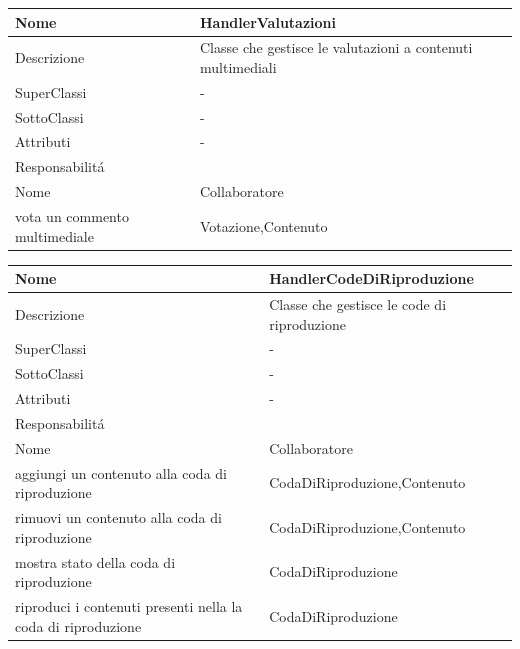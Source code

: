 \begin{center}
    \begin{tabular}{ |p{3cm}|p{3cm}|p{3cm}|p{3cm}| }
        \hline
        Nome & \multicolumn{3}{|p{9cm}|}{HandlerValutazioni} \\\hline
        Descrizione & \multicolumn{3}{|p{9cm}|}{Classe che gestisce le valutazioni a contenuti multimediali} \\\hline
        SuperClassi & \multicolumn{3}{|p{9cm}|}{-} \\\hline
        SottoClassi & \multicolumn{3}{|p{9cm}|}{-} \\\hline
        Attributi & \multicolumn{3}{|p{9cm}|}{-} \\\hline
        \multicolumn{4}{|p{12cm}|}{Responsabilit\'a} \\\hline
        \multicolumn{2}{|p{6cm}|}{Nome} & \multicolumn{2}{|p{6cm}|}{Collaboratore} \\\hline
        \multicolumn{2}{|p{6cm}|}{vota un commento multimediale} & \multicolumn{2}{|p{6cm}|}{Votazione,Contenuto} \\\hline
    \end{tabular}
\end{center}

\begin{center}
    \begin{tabular}{ |p{3cm}|p{3cm}|p{3cm}|p{3cm}| }
        \hline
        Nome & \multicolumn{3}{|p{9cm}|}{HandlerCodeDiRiproduzione} \\\hline
        Descrizione & \multicolumn{3}{|p{9cm}|}{Classe che gestisce le code di riproduzione} \\\hline
        SuperClassi & \multicolumn{3}{|p{9cm}|}{-} \\\hline
        SottoClassi & \multicolumn{3}{|p{9cm}|}{-} \\\hline
        Attributi & \multicolumn{3}{|p{9cm}|}{-} \\\hline
        \multicolumn{4}{|p{12cm}|}{Responsabilit\'a} \\\hline
        \multicolumn{2}{|p{6cm}|}{Nome} & \multicolumn{2}{|p{6cm}|}{Collaboratore} \\\hline
        \multicolumn{2}{|p{6cm}|}{aggiungi un contenuto alla coda di riproduzione} & \multicolumn{2}{|p{6cm}|}{CodaDiRiproduzione,Contenuto} \\\hline
        \multicolumn{2}{|p{6cm}|}{rimuovi un contenuto alla coda di riproduzione} & \multicolumn{2}{|p{6cm}|}{CodaDiRiproduzione,Contenuto} \\\hline
        \multicolumn{2}{|p{6cm}|}{mostra stato della coda di riproduzione} & \multicolumn{2}{|p{6cm}|}{CodaDiRiproduzione} \\\hline
        \multicolumn{2}{|p{6cm}|}{riproduci i contenuti presenti nella la coda di riproduzione} & \multicolumn{2}{|p{6cm}|}{CodaDiRiproduzione} \\\hline
    \end{tabular}
\end{center}


